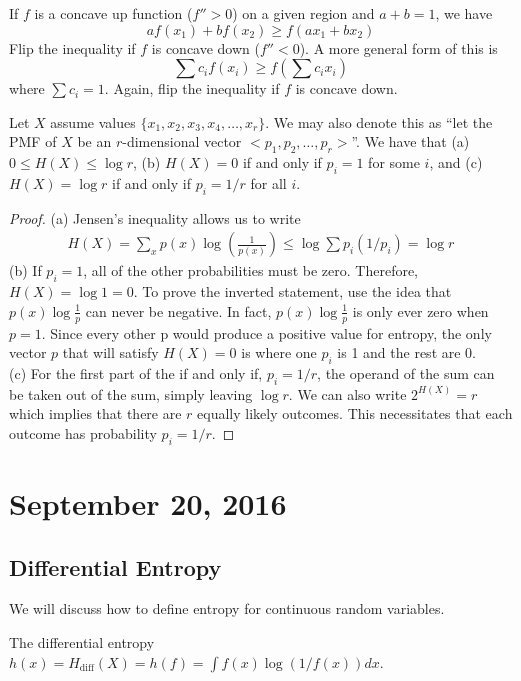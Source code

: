 \documentclass[11pt]{article}
\theoremstyle{definition}
\begin{document}
 If $f$ is a concave up function ($f'' > 0$) on a given region and $a+b = 1$, we have $$af(x_1) + b f(x_2) \geq f(ax_1 + bx_2)$$Flip the inequality if $f$ is concave down ($f'' < 0$). A more general form of this is $$\sum c_i f(x_i) \geq f(\sum c_i x_i)$$where $\sum c_i = 1$. Again, flip the inequality if $f$ is concave down. 

\theorem Let $X$ assume values $\{x_1, x_2, x_3, x_4, \dots, x_r \}$. We may also denote this as ``let the PMF of $X$ be an $r$-dimensional vector $<p_1, p_2, \dots, p_r >$''. We have that (a) $0 \leq H(X) \leq \log r$, (b) $H(X) = 0$ if and only if $p_i = 1$ for some $i$, and (c) $H(X) = \log r$ if and only if $p_i = 1/r$ for all $i$. 

\begin{proof}
(a) Jensen's inequality allows us to write 
\begin{align*}
H(X) = \sum_x p(x) \log \left( \frac{1}{p(x)} \right) \leq \log \sum p_i (1/p_i) = \log r
\end{align*}
(b) If $p_i = 1$, all of the other probabilities must be zero. Therefore, $H(X) = \log 1 = 0.$
     To prove the inverted statement, use the idea that $p(x) \log{\frac{1}{p}}$ can never be negative. In fact, $p(x) \log{\frac{1}{p}}$ is only
     ever zero when $p=1$. Since every other p would produce a positive value for entropy, the only vector $p$ that will satisfy $H(X) = 0$ is 
     where one $p_i$ is 1 and the rest are 0. \\
(c) For the first part of the if and only if, $p_i = 1/r$, the operand of the sum can be taken out of the sum, simply leaving $\log r$. We can also write $2^{H(X)} = r$ which implies that there are $r$ equally likely outcomes. This necessitates that each outcome has probability $p_i = 1/r$. 
\end{proof}

\section{September 20, 2016}

\subsection{Differential Entropy}

We will discuss how to define entropy for continuous random variables. 

\theorem The differential entropy $h(x) = H_{\mathrm{diff}}(X) = h(f) = \int f(x) \log (1/f(x)) dx$. 
\end{document}
